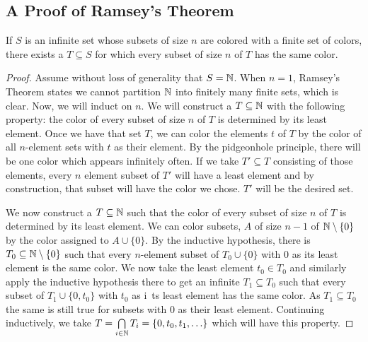 \subsection{A Proof of Ramsey's Theorem}

\begin{theorem}\label{ramseys_theorem}
If \(S\) is an infinite set whose subsets of size \(n\) are colored with a finite set of colors, there exists a \(T \subseteq S\) for which every subset of size \(n\) of \(T\) has the same color.
\end{theorem}

\begin{proof}
Assume without loss of generality that \(S = \mathbb{N}\).
When \(n=1\), Ramsey's Theorem states we cannot partition \(\mathbb{N}\) into finitely many finite sets, which is clear.
Now, we will induct on \(n\).
We will construct a \(T \subseteq \mathbb{N}\) with the following property: the color of every subset of size \(n\) of \(T\) is determined by its least element.
Once we have that set \(T\), we can color the elements \(t\) of \(T\) by the color of all \(n\)-element sets with \(t\) as their element.
By the pidgeonhole principle, there will be one color which appears infinitely often.
If we take \(T' \subseteq T\) consisting of those elements, every \(n\) element subset of \(T'\) will have a least element and by construction, that subset will have the color we chose.
\(T'\) will be the desired set.

We now construct a \(T \subseteq \mathbb{N}\) such that the color of every subset of size \(n\) of \(T\) is determined by its least element.
We can color subsets, \(A\) of size \(n-1\) of \(\mathbb{N} \setminus \{0\}\) by the color assigned to \(A \cup \{0\}\).
By the inductive hypothesis, there is \(T_0 \subseteq \mathbb{N} \setminus \{0\}\) such that every \(n\)-element subset of \(T_0 \cup \{0\}\) with 0 as its least element is the same color.
We now take the least element \(t_0 \in T_0\) and similarly apply the inductive hypothesis there to get an infinite \(T_1 \subseteq T_0\) such that every subset of \(T_1 \cup \{0, t_0\}\) with \(t_0\) as i\
ts least element has the same color.
As \(T_1 \subseteq T_0\) the same is still true for subsets with \(0\) as their least element.
Continuing inductively, we take \(T = \bigcap\limits_{i \in \mathbb{N}}T_i = \{0, t_0, t_1, \ldots\}\) which will have this property.
\end{proof}


